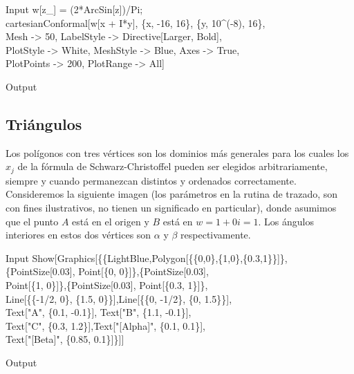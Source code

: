 \begin{mmaCell}{Input}
	  w[z_] = (2*ArcSin[z])/Pi;\\cartesianConformal[w[x + I*y], \{x, -16, 16\}, \{y, 10^(-8), 16\},\\Mesh -> 50, LabelStyle -> Directive[Larger, Bold],\\PlotStyle -> White, MeshStyle -> Blue, Axes -> True,\\PlotPoints -> 200, PlotRange -> All]
\end{mmaCell}
\begin{mmaCell}[moregraphics={moreig={scale=0.7}}]{Output}
\end{mmaCell}

\subsection{Triángulos}

Los polígonos con tres vértices son los dominios más generales para los cuales los $x_j$ de la fórmula de  Schwarz-Christoffel pueden ser elegidos arbitrariamente, siempre y cuando permanezcan distintos y ordenados correctamente. Consideremos la siguiente imagen (los parámetros en la rutina de trazado, son con fines ilustrativos, no tienen un  significado en particular), donde asumimos que el punto $A$ está en el origen y $B$ está en $w =1+0i=1$. Los ángulos interiores en estos dos vértices son $\alpha$ y $\beta$ respectivamente.

\begin{mmaCell}{Input}
	 Show[Graphics[\{\{LightBlue,Polygon[\{\{0,0\},\{1,0\},\{0.3,1\}\}]\},\\ \{PointSize[0.03], Point[\{0, 0\}]\},\{PointSize[0.03],\\Point[\{1, 0\}]\},\{PointSize[0.03], Point[\{0.3, 1\}]\}, \\Line[\{\{-1/2, 0\}, \{1.5, 0\}\}],Line[\{\{0, -1/2\}, \{0, 1.5\}\}],\\Text["A", \{0.1, -0.1\}], Text["B", \{1.1, -0.1\}],\\Text["C", \{0.3, 1.2\}],Text["[Alpha]", \{0.1, 0.1\}],\\Text["[Beta]", \{0.85, 0.1\}]\}]]
\end{mmaCell}

\begin{mmaCell}[moregraphics={moreig={scale=0.8}}]{Output}
\end{mmaCell}

